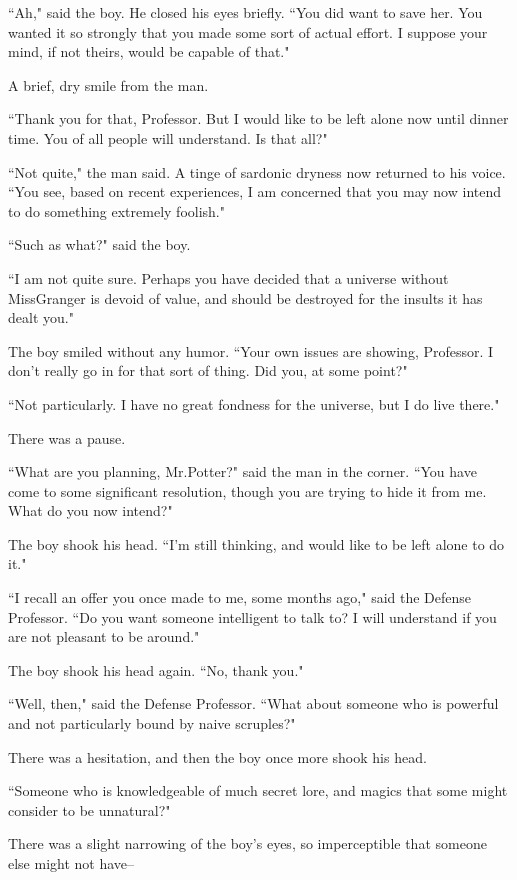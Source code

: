 ``Ah," said the boy. He closed his eyes briefly. ``You did want to save her. You wanted it so strongly that you made some sort of actual effort. I suppose your mind, if not theirs, would be capable of that."

A brief, dry smile from the man.

``Thank you for that, Professor. But I would like to be left alone now until dinner time. You of all people will understand. Is that all?"

``Not quite," the man said. A tinge of sardonic dryness now returned to his voice. ``You see, based on recent experiences, I am concerned that you may now intend to do something extremely foolish."

``Such as what?" said the boy.

``I am not quite sure. Perhaps you have decided that a universe without Miss\?Granger is devoid of value, and should be destroyed for the insults it has dealt you."

The boy smiled without any humor. ``Your own issues are showing, Professor. I don't really go in for that sort of thing. Did you, at some point?"

``Not particularly. I have no great fondness for the universe, but I do live there."

There was a pause.

``What are you planning, Mr.\?Potter?" said the man in the corner. ``You have come to some significant resolution, though you are trying to hide it from me. What do you now intend?"

The boy shook his head. ``I'm still thinking, and would like to be left alone to do it."

``I recall an offer you once made to me, some months ago," said the Defense Professor. ``Do you want someone intelligent to talk to? I will understand if you are not pleasant to be around."

The boy shook his head again. ``No, thank you."

``Well, then," said the Defense Professor. ``What about someone who is powerful and not particularly bound by naive scruples?"

There was a hesitation, and then the boy once more shook his head.

``Someone who is knowledgeable of much secret lore, and magics that some might consider to be unnatural?"

There was a slight narrowing of the boy's eyes, so imperceptible that someone else might not have\---

